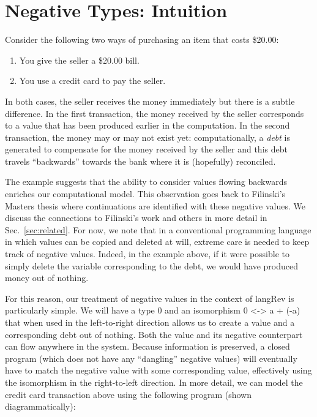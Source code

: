 \documentclass[preprint]{sigplanconf}
\begin{document}
\section{Negative Types: Intuition} 

Consider the following two ways of purchasing an item that costs \$20.00:
\begin{enumerate}
\item You give the seller a \$20.00 bill.
\item You use a credit card to pay the seller.
\end{enumerate}
In both cases, the seller receives the money immediately but there is a
subtle difference. In the first transaction, the money received by the seller
corresponds to a value that has been produced earlier in the computation. In
the second transaction, the money may or may not exist yet: computationally,
a \emph{debt} is generated to compensate for the money received by the seller
and this debt travels ``backwards'' towards the bank where it is (hopefully)
reconciled.

The example suggests that the ability to consider values flowing backwards
enriches our computational model. This observation goes back to Filinski's
Masters thesis where continuations are identified with these negative values.
We discuss the connections to Filinski's work and others in more detail in
Sec.~\ref{sec:related}. For now, we note that in a conventional programming
language in which values can be copied and deleted at will, extreme care is
needed to keep track of negative values. Indeed, in the example above, if it
were possible to simply delete the variable corresponding to the debt, we
would have produced money out of nothing. 

For this reason, our treatment of negative values in the context of
{{langRev}} is particularly simple. We will have a type $0$ and an
isomorphism {{0 <-> a + (-a)}} that when used in the left-to-right direction
allows us to create a value and a corresponding debt out of nothing. Both the
value and its negative counterpart can flow anywhere in the system. Because
information is preserved, a closed program (which does not have any
``dangling'' negative values) will eventually have to match the negative
value with some corresponding value, effectively using the isomorphism in the
right-to-left direction. In more detail, we can model the credit card
transaction above using the following program (shown diagrammatically):
\end{document}

